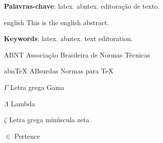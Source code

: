 \begin{dedicatoria}
   \vspace*{\fill}
   \centering
   \noindent
   \textit{} \vspace*{\fill}
\end{dedicatoria}
\begin{agradecimentos}

\end{agradecimentos}
\begin{epigrafe}
    \vspace*{\fill}
	\begin{flushright}
		\textit{}
	\end{flushright}
\end{epigrafe}
\setlength{\absparsep}{18pt} %
\begin{resumo}


 \textbf{Palavras-chave}: latex. abntex. editoração de texto.
\end{resumo}

\begin{resumo}[Abstract]
 \begin{otherlanguage*}{english}
   This is the english abstract.

   \vspace{\onelineskip}
 
   \noindent 
   \textbf{Keywords}: latex. abntex. text editoration.
 \end{otherlanguage*}
\end{resumo}
\listoffigures*
\cleardoublepage
\listofquadros*
\cleardoublepage
\listoftables*
\cleardoublepage
\begin{siglas}
  \item[ABNT] Associação Brasileira de Normas Técnicas
  \item[abnTeX] ABsurdas Normas para TeX
\end{siglas}
\begin{simbolos}
  \item[$ \Gamma $] Letra grega Gama
  \item[$ \Lambda $] Lambda
  \item[$ \zeta $] Letra grega minúscula zeta
  \item[$ \in $] Pertence
\end{simbolos}
\tableofcontents*
\cleardoublepage
\textual

